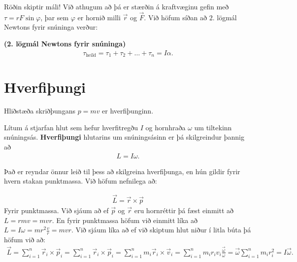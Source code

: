 \ifdefined \wholebook \else\documentclass[oneside]{book}\usepackage{EdlBook}\graphicspath{{figures/}}
\begin{document}
Röðin skiptir máli! Við athugum að þá er stærðin á kraftvæginu gefin með $\tau = rF\sin\varphi$, þar sem $\varphi$ er hornið milli $\vec{r}$ og $\vec{F}$. Við höfum síðan að $2.$ lögmál Newtons fyrir snúninga verður:

\begin{tcolorbox}
\begin{theorem}
\textbf{(2. lögmál Newtons fyrir snúninga)} 
\begin{align*}
    \tau_{\text{heild}} = \tau_1 + \tau_2 + \ldots + \tau_n = I \alpha.
\end{align*}
\end{theorem}
\end{tcolorbox}


\section{Hverfiþungi}

Hliðstæða skriðþungans $p = mv$ er hverfiþunginn.
\begin{tcolorbox}
\begin{definition}
Lítum á stjarfan hlut sem hefur hverfitregðu $I$ og hornhraða $\omega$ um tiltekinn snúningsás. \textbf{Hverfiþungi} hlutarins um snúningsásinn er þá skilgreindur þannig að
\begin{align*}
    L = I\omega.
\end{align*}
\end{definition}
\end{tcolorbox}

Það er reyndar önnur leið til þess að skilgreina hverfiþunga, en hún gildir fyrir hvern stakan punktmassa. Við höfum nefnilega að:

\begin{align*}
    \vec{L} = \vec{r}\times \vec{p}
\end{align*}
Fyrir punktmassa. Við sjáum að ef $\vec{p}$ og $\vec{r}$ eru hornréttir þá fæst einmitt að $L = rmv = mvr$. En fyrir punktmassa höfum við einmitt líka að $L = I\omega = mr^2 \frac{v}{r} = mvr$. Við sjáum líka að ef við skiptum hlut niður í litla búta þá höfum við að:
\begin{align*}
    \vec{L} = \sum_{i=1}^{n} \vec{r}_i \times \vec{p}_i =  \sum_{i=1}^{n} \vec{r}_i \times \vec{p}_i = \sum_{i=1}^{n} m_i \vec{r}_i \times \vec{v}_i = \sum_{i=1}^{n} m_i r_i v_i \frac{\vec{\omega}}{\omega} = \vec{\omega} \sum_{i=1}^{n}m_i r_i^2 = I\vec{\omega}.
\end{align*}
\end{document}
